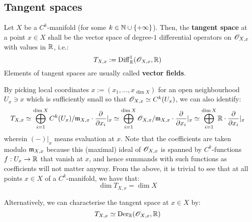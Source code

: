     \subsection{Tangent spaces}
        \begin{definition} \label{def: tangent_spaces}
            Let $X$ be a $C^k$-manifold (for some $k \in \mathbb{N} \cup \{+\infty\}$). Then, the \textbf{tangent space} at a point $x \in X$ shall be the vector space of degree-$1$ differential operators on $\mathscr{O}_{X, x}$ with values in $\mathbb{R}$, i.e.:
                $$T_{X, x} := \mathrm{Diff}^1_{\mathbb{R}}( \mathscr{O}_{X, x}, \mathbb{R} )$$
            Elements of tangent spaces are usually called \textbf{vector fields}.
        \end{definition}
        By picking local coordinates $x := (x_1, ..., x_{\dim X})$ for an open neighbourhood $U_x \ni x$ which is sufficiently small so that $\mathscr{O}_{X, x} \simeq C^k(U_x)$, we can also identify:
            $$T_{X, x} \simeq \bigoplus_{i = 1}^{\dim X} C^k(U_x)/\mathfrak{m}_{X, x} \cdot \frac{\partial}{\partial x_i} |_x \simeq \bigoplus_{i = 1}^{\dim X} \mathscr{O}_{X, x}/\mathfrak{m}_{X, x} \cdot \frac{\partial}{\partial x_i} |_x \simeq \bigoplus_{i = 1}^{\dim X} \mathbb{R} \cdot \frac{\partial}{\partial x_i} |_x$$
        wherein $(-) |_x$ means evaluation at $x$. Note that the coefficients are taken modulo $\mathfrak{m}_{X, x}$ because this (maximal) ideal of $\mathscr{O}_{X, x}$ is spanned by $C^k$-functions $f: U_x \to \mathbb{R}$ that vanish at $x$, and hence summands with such functions as coefficients will not matter anyway. From the above, it is trivial to see that at all points $x \in X$ of a $C^k$-manifold, we have that:
            $$\dim T_{X, x} = \dim X$$

        Alternatively, we can characterise the tangent space at $x \in X$ by:
            $$T_{X, x} \simeq \mathrm{Der}_{\mathbb{R}}(\mathscr{O}_{X, x}, \mathbb{R})$$

